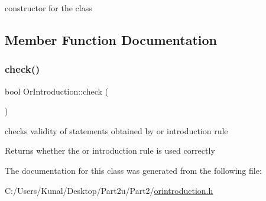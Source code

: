 constructor for the class 



\subsection{Member Function Documentation}
\mbox{\label{class_or_introduction_ab423ec56ad49734ee6165ebbc66463f2}} 
\subsubsection{\texorpdfstring{check()}{check()}}
{\footnotesize\ttfamily bool Or\+Introduction\+::check (\begin{DoxyParamCaption}{ }\end{DoxyParamCaption})\hspace{0.3cm}{\ttfamily [inline]}}



checks validity of statements obtained by or introduction rule 

\begin{DoxyReturn}{Returns}
whether the or introduction rule is used correctly 
\end{DoxyReturn}


The documentation for this class was generated from the following file\+:\begin{DoxyCompactItemize}
\item 
C\+:/\+Users/\+Kunal/\+Desktop/\+Part2u/\+Part2/\mbox{\hyperlink{orintroduction_8h}{orintroduction.\+h}}\end{DoxyCompactItemize}
